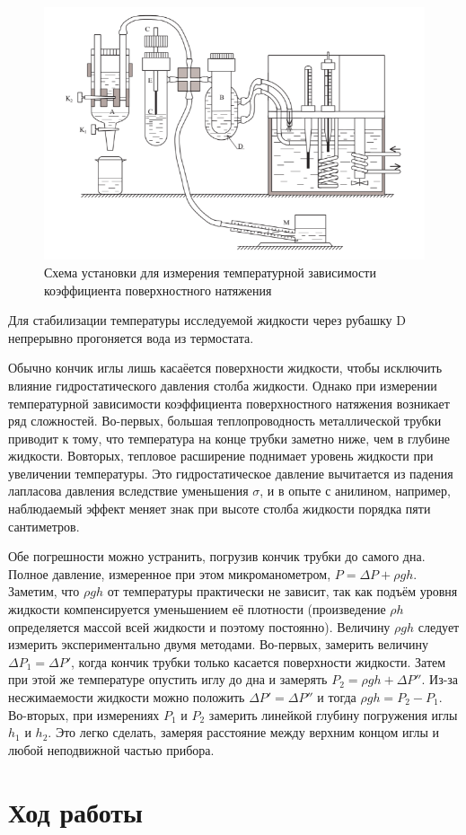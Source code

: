 \documentclass[12pt]{article}
\begin{document}
    \begin{figure}[H]
        \centering
        \includegraphics[scale=2]{stand.png}
        \caption{
        Схема установки для измерения температурной зависимости 
        коэффициента поверхностного натяжения
        }
    \end{figure} 
    Для стабилизации температуры исследуемой жидкости через рубашку D непрерывно
    прогоняется вода из термостата.

    Обычно кончик иглы лишь касаёется поверхности жидкости, чтобы исключить
    влияние гидростатического давления столба жидкости. Однако при измерении
    температурной зависимости коэффициента поверхностного натяжения возникает
    ряд сложностей. Во-первых, большая теплопроводность металлической трубки
    приводит к тому, что температура на конце трубки заметно ниже, чем в глубине
    жидкости. Вовторых, тепловое расширение поднимает уровень жидкости при
    увеличении температуры. Это гидростатическое давление вычитается из падения
    лапласова давления вследствие уменьшения $\sigma$, и в опыте с анилином,
    например, наблюдаемый эффект меняет знак при высоте столба жидкости порядка
    пяти сантиметров.
    
    Обе погрешности можно устранить, погрузив кончик трубки до самого дна.
    Полное давление, измеренное при этом микроманометром, $P=\Delta P+\rho g h$.
    Заметим, что $\rho g h$ от температуры практически не зависит, так как
    подъём уровня жидкости компенсируется уменьшением её плотности (произведение
    $\rho h$ определяется массой всей жидкости и поэтому постоянно). Величину
    $\rho g h$ следует измерить экспериментально двумя методами. Во-первых, 
    замерить величину $\Delta P_1 = \Delta P'$, когда кончик трубки только
    касается поверхности жидкости. Затем при этой же температуре опустить иглу
    до дна и замерять $P_2 = \rho gh + \Delta P''$. Из-за несжимаемости 
    жидкости можно положить $\Delta P' = \Delta P''$ и тогда $\rho gh = P_2 -
    P_1$. Во-вторых, при измерениях $P_1$ и $P_2$ замерить линейкой глубину
    погружения иглы $h_1$ и $h_2$. Это легко сделать, замеряя расстояние 
    между верхним концом иглы и любой неподвижной частью прибора.

    \section{Ход работы}
\end{document}
